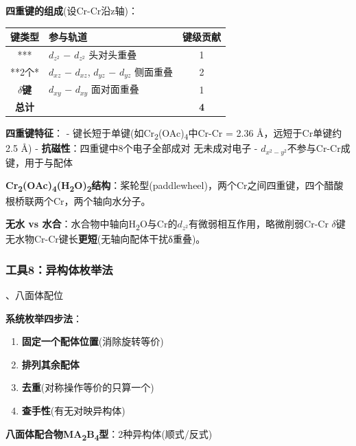 \textbf{四重键的组成}(设Cr-Cr沿z轴)：

{\def\LTcaptype{none} %
\begin{longtable}[]{@{}clc@{}}
\toprule\noalign{}
键类型 & 参与轨道 & 键级贡献 \\
\midrule\noalign{}
\endhead
\bottomrule\noalign{}
\endlastfoot
*** & \(d_{z^2}\) − \(d_{z^2}\) 头对头重叠 & 1 \\
**2个* & \(d_{xz}\) − \(d_{xz}\), \(d_{yz}\) − \(d_{yz}\) 侧面重叠 & 2 \\
\textbf{\(\delta\)键} & \(d_{xy}\) − \(d_{xy}\) 面对面重叠 & 1 \\
\textbf{总计} & & \textbf{4} \\
\end{longtable}
}

\textbf{四重键特征}：
- 键长短于单键(如Cr\textsubscript{2}(OAc)\textsubscript{4}中Cr-Cr = 2.36 Å，远短于Cr单键约2.5 Å)
- \textbf{抗磁性}：四重键中8个电子全部成对 \箭 无未成对电子
- \(d_{x^2-y^2}\)不参与Cr-Cr成键，用于与配体

\textbf{Cr\textsubscript{2}(OAc)\textsubscript{4}(H\textsubscript{2}O)\textsubscript{2}结构}：桨轮型(paddlewheel)，两个Cr之间四重键，四个醋酸根桥联两个Cr，两个轴向水分子。

\textbf{无水 vs 水合}：水合物中轴向H\textsubscript{2}O与Cr的\(d_{z^2}\)有微弱相互作用，略微削弱Cr-Cr \(\delta\)键 \箭 无水物Cr-Cr键长\textbf{更短}(无轴向配体干扰δ重叠)。

\subsubsection{工具8：异构体枚举法}\label{ux5de5ux51778ux5f02ux6784ux4f53ux679aux4e3eux6cd5}

、八面体配位

\textbf{系统枚举四步法}：

\begin{enumerate}
\def\labelenumi{\arabic{enumi}.}
\tightlist
\item
  \textbf{固定一个配体位置}(消除旋转等价)
\item
  \textbf{排列其余配体}
\item
  \textbf{去重}(对称操作等价的只算一个)
\item
  \textbf{查手性}(有无对映异构体)
\end{enumerate}

\textbf{八面体配合物MA\textsubscript{2}B\textsubscript{4}型}：2种异构体(顺式/反式)

